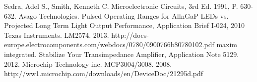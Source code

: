\begin{thebibliography}{11}
		Sedra, Adel S., Smith, Kenneth C. Microelectronic Circuits, 3rd Ed. 1991, P. 630-632.
		Avago Technologies. Pulsed Operating Ranges for AllnGaP LEDs vs. Projected Long Term Light Output Performance, Application Brief I-024, 2010
		Texas Instruments. LM2574. 2013. http://docs-europe.electrocomponents.com/webdocs/0780/0900766b80780102.pdf
		maxim integrated. Stabilize Your Transimpedance Amplifier, Application Note 5129. 2012.
		Microchip Technology inc. MCP3004/3008. 2008. http://ww1.microchip.com/downloads/en/DeviceDoc/21295d.pdf
\end{thebibliography}
